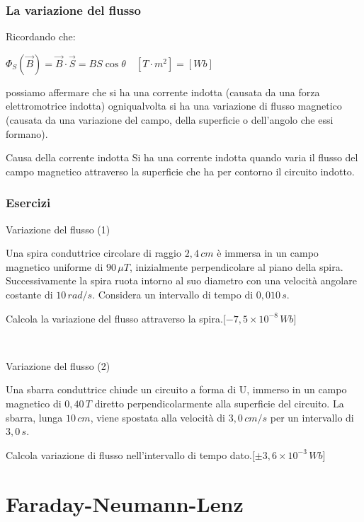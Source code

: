 \documentclass[]{beamer}
\theoremstyle{plain}
\begin{document}
\begin{frame}
  \frametitle{La variazione del flusso}
  Ricordando che:
\begin{center}
\colorbox{blue!30}{$ \Phi_S (\vec{B}) = \vec{B} \cdot \vec{S} = BS \cos\theta \quad [T \cdot m^2] = [Wb]$}
\end{center}\pause
possiamo affermare che  si ha una corrente indotta (causata da una forza elettromotrice indotta) ogniqualvolta si ha una variazione di flusso magnetico (causata da una variazione del campo, della superficie o dell'angolo che essi formano).\pause
\begin{block}{Causa della corrente indotta}
Si ha una corrente indotta quando varia il flusso del campo magnetico attraverso la superficie che ha per contorno il circuito indotto.
\end{block}
\end{frame}



\begin{frame}
\frametitle{Esercizi}
\begin{exampleblock}{Variazione del flusso (1)}
  \small{
  Una spira conduttrice circolare di raggio $ 2,4 \, cm $ è immersa in un campo magnetico uniforme di $ 90 \, \mu T $, inizialmente perpendicolare al piano della spira. Successivamente la spira ruota intorno al suo diametro con una velocità angolare costante di $ 10 \, rad/s $. Considera un intervallo di tempo di $ 0,010 \, s $.
  
  Calcola la variazione del flusso attraverso la spira.\hspace*{\fill}[$ -7,5 \times 10^{-8} \, Wb $]}
\end{exampleblock}

~

\begin{exampleblock}{Variazione del flusso (2)}
  \small{
  Una sbarra conduttrice chiude un circuito a forma di U, immerso in un campo magnetico  di $ 0,40 \, T $ diretto perpendicolarmente alla superficie del circuito. La sbarra, lunga $ 10 \, cm $, viene spostata alla velocità di $ 3,0 \, cm/s $ per un intervallo di $ 3,0 \, s $.

  Calcola variazione di flusso nell'intervallo di tempo dato.\hspace*{\fill}[$ \pm 3,6 \times 10^{-3} \, Wb $]}
\end{exampleblock}
\end{frame}

\section{Faraday-Neumann-Lenz}
\end{document}
